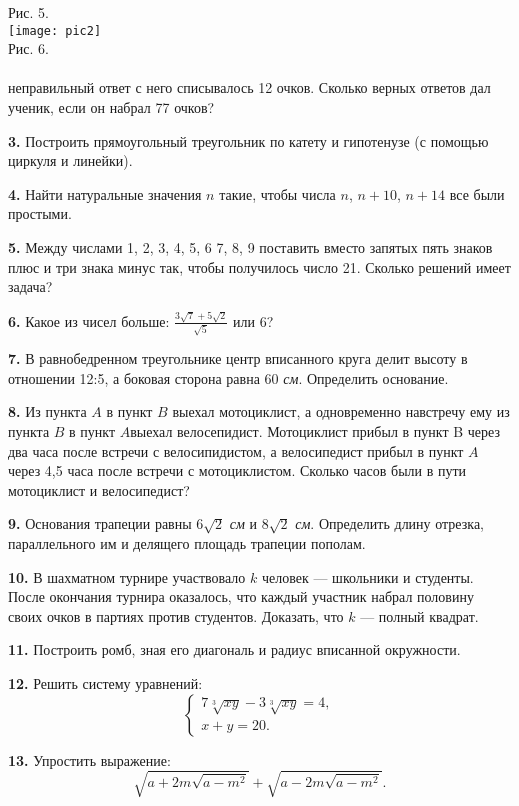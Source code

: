 \documentclass[a4paper,5pt]{article}
\begin{document}
\begin{multicols}{2}
Рис. 5. \\
\texttt{[image: pic2]} \\
Рис. 6. \\
\\
неправильный ответ с него списывалось 12 очков. Сколько верных ответов дал ученик, если он набрал 77 очков?
\par \textbf{3. } Построить прямоугольный треугольник по катету и гипотенузе (с помощью циркуля и линейки).
\par \textbf{4. } Найти натуральные значения $n$ такие, чтобы числа $n$, $n+10$, $n+14$ все были простыми.
\par \textbf{5. } Между числами 1, 2, 3, 4, 5, 6 7, 8, 9 поставить вместо запятых пять знаков плюс и три знака минус так, чтобы получилось число 21. Сколько решений имеет задача?
\par \textbf{6. } Какое из чисел больше: $\frac{3\sqrt{7}+5\sqrt{2}}{\sqrt{5}}$ или 6?
\par \textbf{7. } В равнобедренном треугольнике центр вписанного круга делит высоту в отношении 12:5, а боковая сторона равна 60 \textit{см}. Определить основание.
\par \textbf{8. } Из пункта $A$ в пункт $B$ выехал мотоциклист, а одновременно навстречу ему из пункта $B$ в пункт $A$выехал велосепидист. Мотоциклист прибыл в пункт B через два часа после встречи с велосипидистом, а велосипедист прибыл в пункт $A$ через 4,5 часа после встречи с мотоциклистом. Сколько часов были в пути мотоциклист и велосипедист?
\par \textbf{9. } Основания трапеции равны $6\sqrt{2}$ \textit{см} и $8\sqrt{2}$ \textit{см}. Определить длину отрезка, параллельного им и делящего площадь трапеции пополам.\
\par \textbf{10. } В шахматном турнире участвовало $k$ человек — школьники и студенты. После окончания турнира оказалось, что каждый участник набрал половину своих очков в партиях против студентов. Доказать, что $k$ — полный квадрат.
\par \textbf{11. } Построить ромб, зная его диагональ и радиус вписанной окружности.
\par \textbf{12. } Решить систему уравнений:
$$
\begin{cases}
7\sqrt[3]{xy}-3\sqrt[3]{xy}=4,
\\
x+y=20.
\end{cases}
$$
\par \textbf{13.} Упростить выражение:
$$
\sqrt{a+2m\sqrt{a-m^2}}+\sqrt{a-2m\sqrt{a-m^2}}.
$$
\end{multicols}
\end{document}
